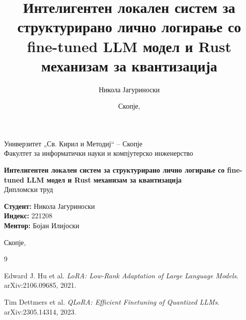 \documentclass[12pt,a4paper]{report}
\title{Интелигентен локален систем за структурирано лично логирање со fine-tuned LLM модел и Rust механизам за квантизација}
\author{Никола Јагуриноски}
\date{Скопје, \the\year}
\begin{document}
\begin{titlepage}
  \centering
  {\large Универзитет „Св. Кирил и Методиј“ -- Скопје\\}
  {\large Факултет за информатички науки и компјутерско инженерство\\[3cm]}

  {\LARGE\bfseries Интелигентен локален систем за структурирано лично логирање со fine-tuned LLM модел и Rust механизам за квантизација\\[0.8cm]}
  {\Large Дипломски труд\\[3cm]}

  \begin{flushleft}
    \textbf{Студент:} Никола Јагуриноски\\
    \textbf{Индекс:} 221208\\[0.5cm]
    \textbf{Ментор:} Бојан Илијоски
  \end{flushleft}

  \vfill
  {Скопје, \the\year}
\end{titlepage}




\tableofcontents
\listoffigures
\listoftables

\clearpage
{}












\appendix


\begin{thebibliography}{9}

Edward J. Hu et al.
\textit{LoRA: Low-Rank Adaptation of Large Language Models}.
arXiv:2106.09685, 2021.

Tim Dettmers et al.
\textit{QLoRA: Efficient Finetuning of Quantized LLMs}.
arXiv:2305.14314, 2023.

\end{thebibliography}
\end{document}
